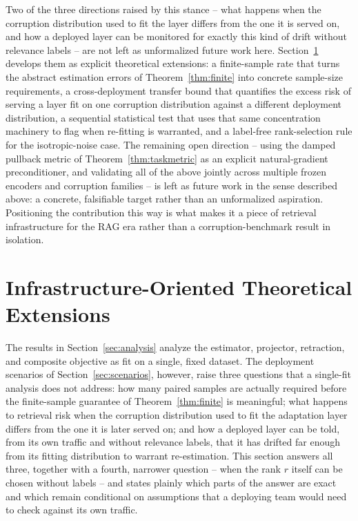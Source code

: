 Two of the three directions raised by this stance -- what happens when the
corruption distribution used to fit the layer differs from the one it is
served on, and how a deployed layer can be monitored for exactly this kind
of drift without relevance labels -- are not left as unformalized future
work here. Section~\ref{sec:extensions} develops them as explicit
theoretical extensions: a finite-sample rate that turns the abstract
estimation errors of Theorem~\ref{thm:finite} into concrete sample-size
requirements, a cross-deployment transfer bound that quantifies the excess
risk of serving a layer fit on one corruption distribution against a
different deployment distribution, a sequential statistical test that uses
that same concentration machinery to flag when re-fitting is warranted, and
a label-free rank-selection rule for the isotropic-noise case. The remaining
open direction -- using the damped pullback metric of
Theorem~\ref{thm:taskmetric} as an explicit natural-gradient preconditioner,
and validating all of the above jointly across multiple frozen encoders and
corruption families -- is left as future work in the sense described above:
a concrete, falsifiable target rather than an unformalized aspiration.
Positioning the contribution this way is what makes it a piece of retrieval
infrastructure for the RAG era rather than a corruption-benchmark result in
isolation.

\section{Infrastructure-Oriented Theoretical Extensions}
\label{sec:extensions}

The results in Section~\ref{sec:analysis} analyze the estimator, projector,
retraction, and composite objective as fit on a single, fixed dataset. The
deployment scenarios of Section~\ref{sec:scenarios}, however, raise three
questions that a single-fit analysis does not address: how many paired
samples are actually required before the finite-sample guarantee of
Theorem~\ref{thm:finite} is meaningful; what happens to retrieval risk when
the corruption distribution used to fit the adaptation layer differs from
the one it is later served on; and how a deployed layer can be told, from
its own traffic and without relevance labels, that it has drifted far
enough from its fitting distribution to warrant re-estimation. This section
answers all three, together with a fourth, narrower question -- when the
rank $r$ itself can be chosen without labels -- and states plainly which
parts of the answer are exact and which remain conditional on assumptions
that a deploying team would need to check against its own traffic.

